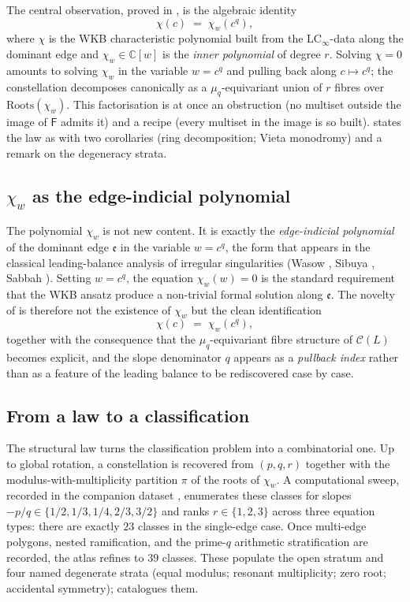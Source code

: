 \documentclass[11pt,a4paper]{article}
\theoremstyle{plain}
\theoremstyle{definition}
\theoremstyle{remark}
\newcommand{\LCinf}{\mathrm{LC}_\infty}
\newcommand{\Roots}{\mathrm{Roots}}
\newcommand{\Cl}{\mathcal{C}}
\newcommand{\Fclass}{\mathsf{F}}
\begin{document}
The central observation, proved in , is the algebraic
identity
\[
   \chi(c) \;=\; \chi_w(c^q),
\]
where $\chi$ is the WKB characteristic polynomial built from the
$\LCinf$-data along the dominant edge and $\chi_w \in \mathbb{C}[w]$
is the \emph{inner polynomial} of degree $r$. Solving $\chi = 0$
amounts to solving $\chi_w$ in the variable $w = c^q$ and pulling
back along $c \mapsto c^q$; the constellation decomposes canonically
as a $\mu_q$-equivariant union of $r$ fibres over $\Roots(\chi_w)$.
This factorisation is at once an obstruction (no multiset outside the
image of $\Fclass$ admits it) and a recipe (every multiset in the
image is so built).  states the law as
 with two corollaries (ring decomposition; Vieta
monodromy) and a remark on the degeneracy strata.

\subsection{$\chi_w$ as the edge-indicial polynomial}
\label{ssec:intro-chi-w}

The polynomial $\chi_w$ is not new content. It is exactly the
\emph{edge-indicial polynomial} of the dominant edge $\mathfrak{e}$
in the variable $w = c^q$, the form that appears in the classical
leading-balance analysis of irregular singularities (Wasow
\cite{wasow}, Sibuya \cite{sibuya}, Sabbah
\cite{sabbah-isomon}). Setting $w = c^q$, the equation $\chi_w(w) = 0$
is the standard requirement that the WKB ansatz produce a
non-trivial formal solution along $\mathfrak{e}$. The novelty of
 is therefore not the existence of $\chi_w$ but the
clean identification
\[
   \chi(c) \;=\; \chi_w(c^q),
\]
together with the consequence that the $\mu_q$-equivariant fibre
structure of $\Cl(L)$ becomes explicit, and the slope denominator $q$
appears as a \emph{pullback index} rather than as a feature of the
leading balance to be rediscovered case by case.

\subsection{From a law to a classification}
\label{ssec:intro-classification}

The structural law turns the classification problem into a
combinatorial one. Up to global rotation, a constellation is recovered
from $(p, q, r)$ together with the modulus-with-multiplicity partition
$\pi$ of the roots of $\chi_w$. A computational sweep, recorded in the
companion dataset \cite{wkb_dataset_v1}, enumerates these classes for
slopes $-p/q \in \{1/2, 1/3, 1/4, 2/3, 3/2\}$ and ranks $r \in
\{1, 2, 3\}$ across three equation types: there are exactly $23$
classes in the single-edge case. Once multi-edge polygons, nested
ramification, and the prime-$q$ arithmetic stratification are recorded,
the atlas refines to $39$ classes. These populate the open stratum
and four named degenerate strata (equal modulus; resonant multiplicity;
zero root; accidental symmetry);  catalogues them.
\end{document}
